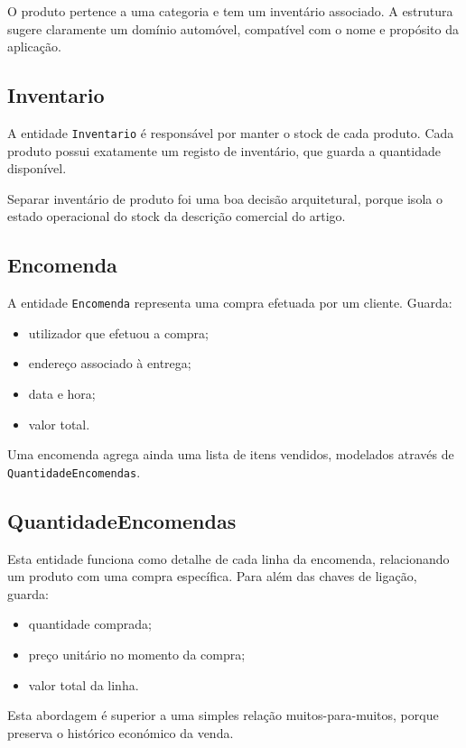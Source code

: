 \documentclass[10pt,a4paper]{report}
\begin{document}
O produto pertence a uma categoria e tem um inventário associado. A estrutura sugere claramente um domínio automóvel, compatível com o nome e propósito da aplicação.

\subsection{Inventario}

A entidade \texttt{Inventario} é responsável por manter o stock de cada produto. Cada produto possui exatamente um registo de inventário, que guarda a quantidade disponível.

Separar inventário de produto foi uma boa decisão arquitetural, porque isola o estado operacional do stock da descrição comercial do artigo.

\subsection{Encomenda}

A entidade \texttt{Encomenda} representa uma compra efetuada por um cliente. Guarda:

\begin{itemize}
    \item utilizador que efetuou a compra;
    \item endereço associado à entrega;
    \item data e hora;
    \item valor total.
\end{itemize}

Uma encomenda agrega ainda uma lista de itens vendidos, modelados através de \texttt{QuantidadeEncomendas}.

\subsection{QuantidadeEncomendas}

Esta entidade funciona como detalhe de cada linha da encomenda, relacionando um produto com uma compra específica. Para além das chaves de ligação, guarda:

\begin{itemize}
    \item quantidade comprada;
    \item preço unitário no momento da compra;
    \item valor total da linha.
\end{itemize}

Esta abordagem é superior a uma simples relação muitos-para-muitos, porque preserva o histórico económico da venda.
\end{document}
